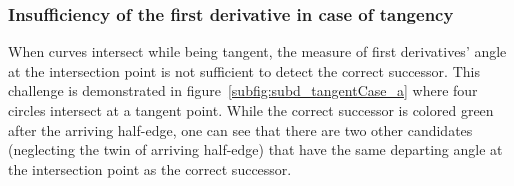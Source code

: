 
\subsubsection{Insufficiency of the first derivative in case of tangency}

When curves intersect while being tangent, the measure of first derivatives' angle at the intersection point is not sufficient to detect the correct successor.
This challenge is demonstrated in figure~\ref{subfig:subd_tangentCase_a} where four circles intersect at a tangent point.
While the correct successor is colored green after the arriving half-edge, one can see that there are two other candidates (neglecting the twin of arriving half-edge) that have the same departing angle at the intersection point as the correct successor.\bigskip

